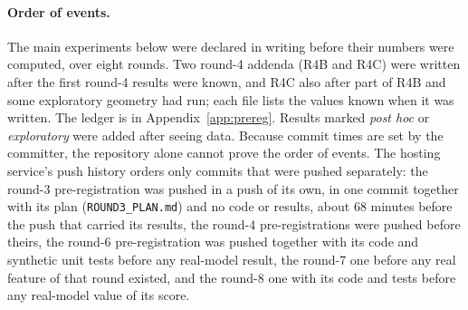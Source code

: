 \documentclass[10pt]{article}
\begin{document}
\paragraph{Order of events.}
The main experiments below were declared in writing before their numbers were computed, over eight rounds.
Two round-4 addenda (R4B and R4C) were written after the first round-4 results were known, and R4C also after part of R4B and some exploratory geometry had run; each file lists the values known when it was written.
The ledger is in Appendix~\ref{app:prereg}.
Results marked \emph{post hoc} or \emph{exploratory} were added after seeing data.
Because commit times are set by the committer, the repository alone cannot prove the order of events. The hosting service's push history orders only commits that were pushed separately: the round-3 pre-registration was pushed in a push of its own, in one commit together with its plan (\texttt{ROUND3\_PLAN.md}) and no code or results, about 68 minutes before the push that carried its results, the round-4 pre-registrations were pushed before theirs, the round-6 pre-registration was pushed together with its code and synthetic unit tests before any real-model result, the round-7 one before any real feature of that round existed, and the round-8 one with its code and tests before any real-model value of its score.

\begin{table}[H]
\centering\footnotesize

\caption{All pre-registered experiments of rounds 1--3 and their outcomes. The pre-registration files are in the repository.}
\label{tab:prereg}
\end{table}

\begin{table}[H]
\centering\footnotesize

\caption{Round-4 pre-registered tests and outcomes (E12 / S11 unless stated). R4B and R4C rows come from addenda written after the R4 results. No kill fired.}
\label{tab:prereg4}
\end{table}

\begin{table}[H]
\centering\footnotesize

\caption{Round-5 pre-registered tests and outcomes (E12 / S11 unless stated). Thresholds were set after scratch runs on five models (SO-type) and three (XCC-type), with plants, worlds and derangements, and a ResNet50 smoke test of the final code. No kill fired.}
\label{tab:prereg5}
\end{table}
\end{document}

